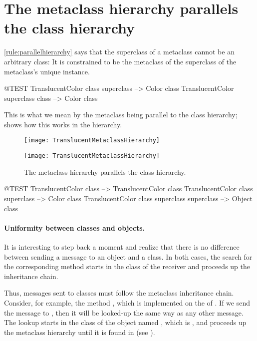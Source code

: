 \documentclass[a4paper,10pt,twoside]{book}
\begin{document}
\section{The metaclass hierarchy parallels the class hierarchy}

\ref{rule:parallelhierarchy} says that the superclass of a metaclass cannot be an arbitrary class:
It is constrained to be the metaclass of the superclass of the metaclass's unique instance.

\begin{code}{@TEST}
TranslucentColor class superclass --> Color class
TranslucentColor superclass class --> Color class
\end{code}

\noindent
This is what we mean by the metaclass  being parallel to the class hierarchy;  shows how this works in the  hierarchy.

\begin{center}
\begin{figure}[!ht]
\ifluluelse
	{\centerline {\texttt{[image: TranslucentMetaclassHierarchy]}}}
	{\centerline {\texttt{[image: TranslucentMetaclassHierarchy]}}}
\caption{The metaclass hierarchy parallels the class hierarchy.\label{fig:parallelHierarchies}}
\end{figure}
\end{center}

\begin{code}{@TEST}
TranslucentColor class                                     --> TranslucentColor class
TranslucentColor class superclass                   --> Color class
TranslucentColor class superclass superclass --> Object class
\end{code}

\paragraph{Uniformity between classes and objects.}
It is interesting to step back a moment and realize that there is no difference between sending a message to an object and a class. 
In both cases, the search for the corresponding method starts in the class of the receiver and proceeds up the inheritance chain.

Thus, messages sent to classes must follow the metaclass inheritance chain.
Consider, for example, the method , which is implemented on the  of .
If we send the message  to , then it will be looked-up the same way as any other message.
The lookup starts in the class of the object named , which is , and proceeds up the metaclass hierarchy until it is found in  (see ).
\end{document}
